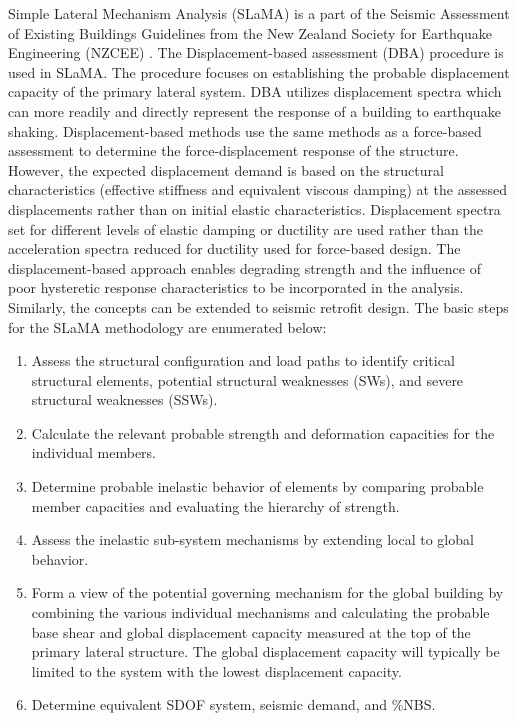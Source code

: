 Simple Lateral Mechanism Analysis (SLaMA) is a part of the Seismic Assessment of Existing Buildings Guidelines from the New Zealand Society for Earthquake Engineering (NZCEE) \cite{NZSEE2019}. The  Displacement-based assessment (DBA) procedure is used in SLaMA. The procedure focuses on establishing the probable displacement capacity of the primary lateral system. DBA utilizes displacement spectra which can more readily and directly represent the response of a building to earthquake shaking. Displacement-based methods use the same methods as a force-based assessment to determine the force-displacement response of the structure. However, the expected displacement demand is based on the structural characteristics (effective stiffness and equivalent viscous damping) at the assessed displacements rather than on initial elastic characteristics. Displacement spectra set for different levels of elastic damping or ductility are used rather than the acceleration spectra reduced for ductility used for force-based design. The displacement-based approach enables degrading strength and the influence of poor
hysteretic response characteristics to be incorporated in the analysis. Similarly, the concepts can be extended to seismic retrofit design. The basic steps for the SLaMA methodology are enumerated below:

\begin{enumerate}
    \item Assess the structural configuration and load paths to identify critical structural elements, potential structural weaknesses (SWs), and severe structural weaknesses (SSWs).
    \item Calculate the relevant probable strength and deformation capacities for the individual members.
    \item Determine probable inelastic behavior of elements by comparing probable member capacities and evaluating the hierarchy of strength.
    \item Assess the inelastic sub-system mechanisms by extending local to global behavior.
    \item Form a view of the potential governing mechanism for the global building by combining the various individual mechanisms and calculating the probable base shear and global displacement capacity measured at the top of the primary lateral structure. The global displacement capacity will typically be limited to the system with the lowest displacement capacity.
    \item Determine equivalent SDOF system, seismic demand, and \%NBS.
\end{enumerate}


